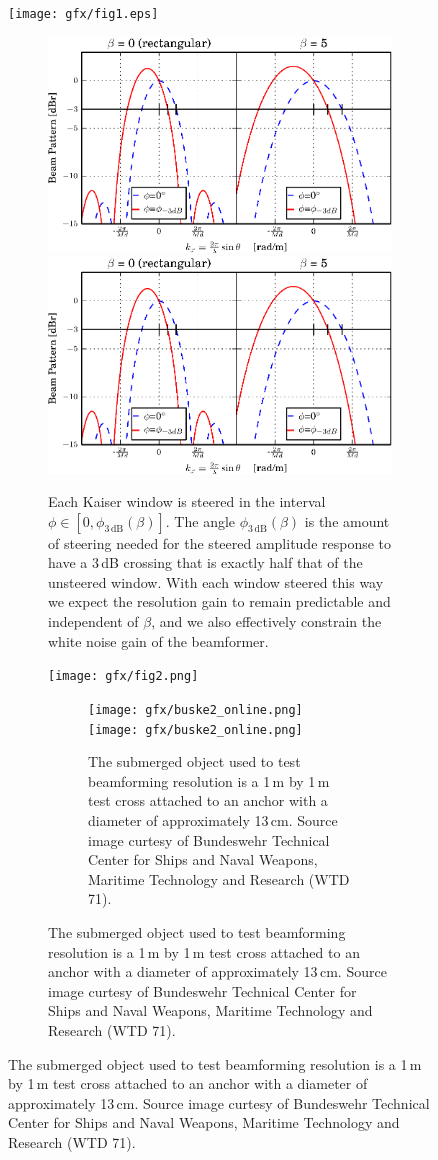 \ifPhdDoc
   \begin{figure}[tbp]\centering%
   \texttt{[image: gfx/fig1.eps]}%
\else
   \begin{figure}[tbp]\centering%
   \ifPeerReview%
      \includegraphics[width=.5\linewidth]{gfx/buske1_online.eps}%
   \else%
      \includegraphics[width=\linewidth]{gfx/buske1_online.eps}%
\fi\fi%
\caption{Each Kaiser window is steered in the interval $\phi\in[0, \phi_{\mathrm{3\,dB}}(\beta)]$. The angle $\phi_{\mathrm{3\,dB}}(\beta)$ is the amount of steering needed for the steered amplitude response to have a \protect\minus{}3\,dB crossing that is exactly half that of the unsteered window. With each window steered this way we expect the resolution gain to remain predictable and independent of $\beta$, and we also effectively constrain the white noise gain of the beamformer.}\label{III_windows_steering}
\end{figure}

\ifPhdDoc
   \begin{figure}[tbp]\centering%
   \texttt{[image: gfx/fig2.png]}%
\else
   \begin{figure}[tbp]\centering%
   \ifPeerReview%
      \texttt{[image: gfx/buske2\_online.png]}%
   \else%
      \texttt{[image: gfx/buske2\_online.png]}%
\fi\fi%
\caption{The submerged object used to test beamforming resolution is a 1\,m by 1\,m test cross attached to an anchor with a diameter of approximately 13\,cm. Source image curtesy of Bundeswehr Technical Center for Ships and Naval Weapons, Maritime Technology and Research (WTD 71).}\label{III_cross}
\end{figure}



\end{figure}
\end{figure}
